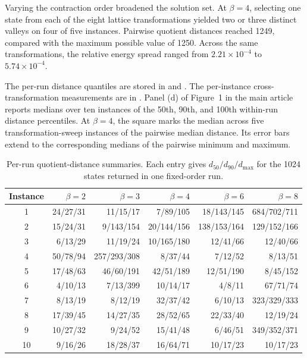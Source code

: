 \documentclass[preprint,12pt,a4paper]{elsarticle}
\begin{document}
Varying the contraction order broadened the solution set. At $\beta=4$,
selecting one state from each of the eight lattice transformations yielded two
or three distinct valleys on four of five instances. Pairwise quotient distances
reached 1249, compared with the maximum possible value of 1250. Across the same
transformations, the relative energy spread ranged from $2.21\times10^{-4}$ to
$5.74\times10^{-4}$.

The per-run distance quantiles are stored in  and
. The per-instance cross-transformation measurements
are in . Panel (d) of Figure~1 in the main article
reports medians over ten instances of the 50th, 90th, and 100th within-run
distance percentiles. At $\beta=4$, the square marks the median across five
transformation-sweep instances of the pairwise median distance. Its error bars
extend to the corresponding medians of the pairwise minimum and maximum.

\begin{table}[htbp]
\scriptsize
\centering
\caption{Per-run quotient-distance summaries. Each entry gives
$d_{50}/d_{90}/d_{\max}$ for the 1024 states returned in one fixed-order run.}
\label{tab:supp-diversity-runs}
\begin{tabular}{@{}crrrrr@{}}
\toprule
Instance & $\beta=2$ & $\beta=3$ & $\beta=4$ & $\beta=6$ & $\beta=8$ \\
\midrule
1  & 24/27/31 & 11/15/17 & 7/89/105 & 18/143/145 & 684/702/711 \\
2  & 15/24/31 & 9/143/154 & 20/144/156 & 138/153/164 & 129/152/166 \\
3  & 6/13/29 & 11/19/24 & 10/165/180 & 12/41/66 & 12/40/66 \\
4  & 50/78/94 & 257/293/308 & 8/37/44 & 7/12/52 & 8/13/51 \\
5  & 17/48/63 & 46/60/191 & 42/51/189 & 12/51/190 & 8/45/152 \\
6  & 4/10/13 & 7/13/399 & 10/14/17 & 4/8/11 & 67/71/74 \\
7  & 8/13/19 & 8/12/19 & 32/37/42 & 6/10/13 & 323/329/333 \\
8  & 17/39/45 & 14/27/35 & 28/52/65 & 22/33/40 & 12/19/24 \\
9  & 10/27/32 & 9/24/52 & 15/41/48 & 6/46/51 & 349/352/371 \\
10 & 9/16/26 & 18/28/37 & 16/64/71 & 10/17/23 & 10/17/23 \\
\bottomrule
\end{tabular}
\end{table}
\end{document}
